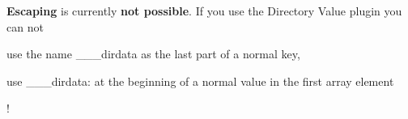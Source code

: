 \begin{DoxyItemize}
\item {\bfseries Escaping} is currently {\bfseries not possible}. If you use the Directory Value plugin you can not
\begin{DoxyItemize}
\item use the name {\ttfamily \+\_\+\+\_\+\+\_\+dirdata} as the last part of a normal key,
\item use {\ttfamily \+\_\+\+\_\+\+\_\+dirdata\+:} at the beginning of a normal value in the first array element
\end{DoxyItemize}

! 
\end{DoxyItemize}
